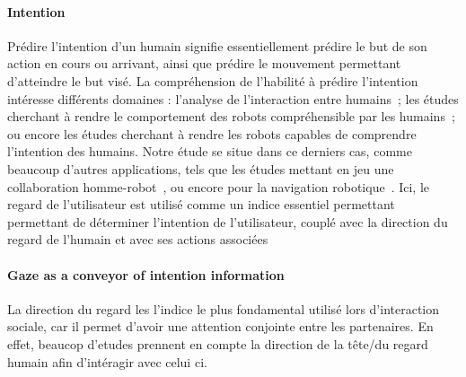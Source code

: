 \documentclass[runningheads,a4paper]{llncs}
\begin{document}
\paragraph{Intention} 
Prédire l'intention d'un humain signifie essentiellement prédire le but de son action en cours ou arrivant, ainsi que prédire le mouvement permettant d'atteindre le but visé.
La compréhension de l'habilité à prédire l'intention intéresse différents domaines : l'analyse de l'interaction entre humains~\cite{meltzoff2007eyes,bretherton1991intentional}; les études cherchant à rendre le comportement des robots compréhensible par les humains~\cite{kim2017collaborative,dragan2014integrating}; ou encore les études cherchant à rendre les robots capables de comprendre l'intention des humains. Notre étude se situe dans ce derniers cas, comme beaucoup d'autres applications, tels que les études mettant en jeu une collaboration homme-robot~\cite{ferrer2014bayesian,wang2012probabilistic}, ou encore pour la navigation robotique~\cite{mitsugami2005robot}. Ici, le regard de l'utilisateur est utilisé comme un indice essentiel permettant permettant de déterminer l'intention de l'utilisateur, couplé avec la direction du regard de l'humain et avec ses actions associées

\paragraph{\label{sec:gazesoa}Gaze as a conveyor of intention information}

La direction du regard les l'indice le plus fondamental utilisé lors d'interaction sociale, car il permet d'avoir une attention conjointe entre les partenaires.
En effet, beaucop d'etudes prennent en compte la direction de la tête/du regard humain afin d'intéragir avec celui ci.
\end{document}
